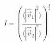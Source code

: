 \begin{equation}\label{eq:hit_isotropy}
  I = \left(\frac
    {\langle|\hat{\vec{v}}_1|^2\rangle}
    {\langle|\hat{\vec{v}}_2|^2\rangle}
  \right)^{\tfrac12}
\end{equation}
